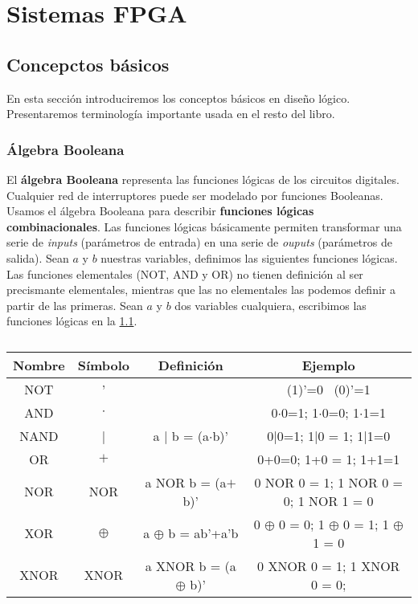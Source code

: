 \chapter{Sistemas FPGA}

\section{Concepctos básicos}

En esta sección introduciremos los conceptos básicos en diseño lógico. Presentaremos terminología importante usada en el resto del libro.

\subsection{Álgebra Booleana}

El \textbf{álgebra Booleana} representa las funciones lógicas de los circuitos digitales. Cualquier red de interruptores puede ser modelado por funciones Booleanas. Usamos el álgebra Booleana para describir \textbf{funciones lógicas combinacionales}. Las funciones lógicas básicamente permiten transformar una serie de \textit{inputs} (parámetros de entrada) en una serie de \textit{ouputs} (parámetros de salida). Sean $a$ y $b$ nuestras variables, definimos las siguientes funciones lógicas. Las funciones elementales (NOT, AND y OR) no tienen definición al ser precismante elementales, mientras que las no elementales las podemos definir a partir de las primeras. Sean $a$ y $b$ dos variables cualquiera, escribimos las funciones lógicas en la \cref{Tab:01-Funciones_Logicas}. 

\begin{table}[H] \centering
    \begin{tabular}{cccc} 
        \toprule 
        \textbf{Nombre} & \textbf{Símbolo } & \textbf{Definición} & \textbf{Ejemplo} \\ \midrule
        NOT & ' &  & (1)'=0 \ (0)'=1 \\
        AND  & $\cdot$ &  & 0$\cdot$0=1; 1$\cdot$0=0; 1$\cdot$1=1  \\
        NAND & |  & a | b = (a$\cdot$b)' & 0|0=1; 1|0 = 1; 1|1=0 \\
        OR  & $+$ &  & 0+0=0; 1+0 = 1; 1+1=1 \\
        NOR & NOR &  a NOR b = (a$+$b)' & 0 NOR 0 = 1; 1 NOR 0 = 0; 1 NOR 1 = 0 \\
        XOR & $\oplus$ & a $\oplus$ b = ab'+a'b & 0 $\oplus$ 0 = 0; 1 $\oplus$ 0 = 1; 1 $\oplus$ 1 = 0\\
        XNOR & XNOR & a XNOR b = (a $\oplus$ b)'  & 0 XNOR 0 = 1; 1 XNOR 0 = 0; \\ \bottomrule
    \end{tabular} 
    \caption{}
    \label{Tab:01-Funciones_Logicas}
\end{table}

